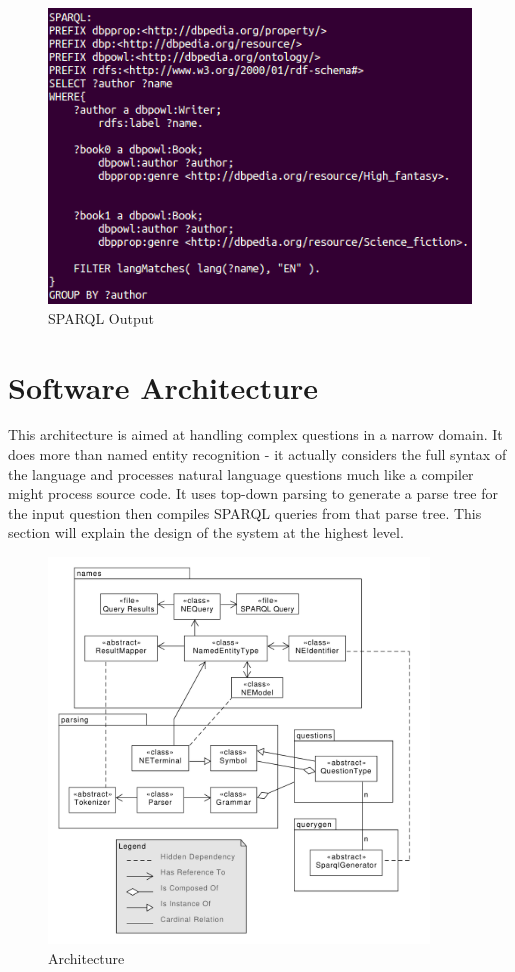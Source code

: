 \documentclass[11pt]{article}
\begin{document}
\begin{figure}[h!]
    \centering
    \includegraphics[width=1\textwidth,natwidth=1,natheight=1]{imgs/demo/sparql.png}
    \caption{SPARQL Output}
    \label{fig:sparql}
\end{figure}

\section{Software Architecture}

This architecture is aimed at handling complex questions in a narrow domain.
It does more than named entity recognition - it actually considers
the full syntax of the language and processes natural language questions
much like a compiler might process source code. It uses
top-down parsing to generate a parse tree for the input question then
compiles SPARQL queries from that parse tree.
This section will explain the design of the system at the highest level.

\begin{figure}[h!]
    \centering
    \includegraphics[width=0.9\textwidth,natwidth=1,natheight=1]{umlet/architecture.pdf}
    \caption{Architecture}
    \label{fig:arch}
\end{figure}
\end{document}
